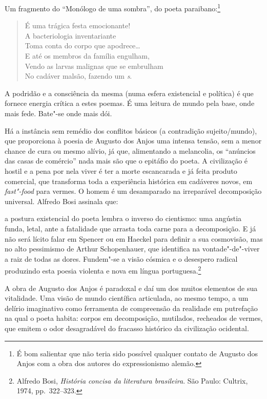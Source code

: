 Um fragmento do “Monólogo de uma sombra”, do poeta
paraibano:\footnote{ É bom salientar que não teria sido possível
qualquer contato de Augusto dos Anjos com a obra dos autores do
expressionismo alemão.}

\begin{verse}
É uma trágica festa emocionante!\\
A bacteriologia inventariante\\
Toma conta do corpo que apodrece\ldots{}\\
E até os membros da família engulham, \\
Vendo as larvas malignas que se embrulham \\
No cadáver malsão, fazendo um \textit{s}.
\end{verse}

A podridão e a consciência da mesma (numa esfera existencial e
política) é que fornece energia crítica a estes poemas. É uma leitura
de mundo pela base, onde mais fede. Bate"-se onde mais dói.

Há a instância sem remédio dos conflitos básicos (a contradição
sujeito/mundo), que proporciona à poesia de Augusto dos Anjos uma
intensa tensão, sem a menor chance de cura ou mesmo alívio, já que,
alimentando a melancolia, os “anúncios das casas de comércio” nada mais
são que o epitáfio do poeta. A civilização é hostil e a pena por nela
viver é ter a morte escancarada e já feita produto comercial, que
transforma toda a experiência histórica em cadáveres novos, em
\textit{fast"-food} para vermes. O homem é um desamparado na irreparável
decomposição universal. Alfredo Bosi assinala que:

\begin{hedraquote}
[\ldots{}] a postura existencial do poeta lembra o inverso do cientismo: uma
angústia funda, letal, ante a fatalidade que arrasta toda carne para a
decomposição. E já não será lícito falar em Spencer ou em Haeckel para
definir a sua cosmovisão, mas no alto pessimismo de Arthur
Schopenhauer, que identifica na vontade"-de"-viver a raiz de todas as
dores. Fundem"-se a visão cósmica e o desespero radical produzindo esta
poesia violenta e nova em língua portuguesa.\footnote{Alfredo Bosi, \textit{História concisa da literatura
brasileira}. São Paulo: Cultrix, 1974, pp.~322--323.}
\end{hedraquote}

A obra de Augusto dos Anjos é paradoxal e daí um dos muitos
elementos de sua vitalidade. Uma visão de mundo científica articulada,
ao mesmo tempo, a um delírio imaginativo como ferramenta de compreensão
da realidade em putrefação na qual o poeta habita: corpos em
decomposição, mutilados, recheados de vermes, que emitem o odor
desagradável do fracasso histórico da civilização ocidental. 

